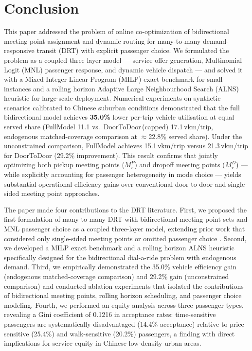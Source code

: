 \section{Conclusion}
\label{sec:conclusion}

This paper addressed the problem of online co-optimization of bidirectional meeting point
assignment and dynamic routing for many-to-many demand-responsive transit (DRT) with
explicit passenger choice.
We formulated the problem as a coupled three-layer model — service offer generation,
Multinomial Logit (MNL) passenger response, and dynamic vehicle dispatch — and solved it
with a Mixed-Integer Linear Program (MILP) exact benchmark for small instances and a
rolling horizon Adaptive Large Neighbourhood Search (ALNS) heuristic for large-scale
deployment.
Numerical experiments on synthetic scenarios calibrated to Chinese suburban conditions
demonstrated that the full bidirectional model achieves \textbf{35.0\%} lower
per-trip vehicle utilisation at equal served share (FullModel 11.1 vs.\
DoorToDoor\,(capped) 17.1\,vkm/trip, endogenous matched-coverage comparison at
$\approx$22.8\% served share). Under the unconstrained comparison, FullModel achieves
15.1\,vkm/trip versus 21.3\,vkm/trip for DoorToDoor (29.2\% improvement).
This result confirms that jointly optimizing both pickup meeting points ($M_r^P$) and
dropoff meeting points ($M_r^D$) — while explicitly accounting for passenger heterogeneity
in mode choice — yields substantial operational efficiency gains over conventional
door-to-door and single-sided meeting point approaches.

The paper made four contributions to the DRT literature.
First, we proposed the first formulation of many-to-many DRT with bidirectional meeting
point sets and MNL passenger choice as a coupled three-layer model, extending prior work
that considered only single-sided meeting points \citep{cortenbach2024} or omitted
passenger choice \citep{wu2025}.
Second, we developed a MILP exact benchmark and a rolling horizon ALNS heuristic
specifically designed for the bidirectional dial-a-ride problem with endogenous demand.
Third, we empirically demonstrated the 35.0\% vehicle efficiency gain (endogenous
matched-coverage comparison) and 29.2\% gain (unconstrained comparison) and conducted
ablation experiments that isolated the contributions of bidirectional meeting points,
rolling horizon scheduling, and passenger choice modeling.
Fourth, we performed an equity analysis across three passenger types, revealing a Gini
coefficient of 0.1216 in acceptance rates: time-sensitive passengers are systematically
disadvantaged (14.4\% acceptance) relative to price-sensitive (25.4\%) and walk-sensitive
(20.2\%) passengers, a finding with direct implications for service equity in Chinese
low-density urban areas.


